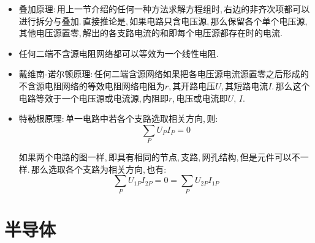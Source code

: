 

\begin{itemize}
\item 叠加原理:\,用上一节介绍的任何一种方法求解方程组时,\,右边的非齐次项都可以进行拆分与叠加.\,直接推论是,\,如果电路只含电压源,\,那么保留各个单个电压源,\,其他电压源置零,\,解出的各支路电流的和即每个电压源都存在时的电流.

\item 任何二端不含源电阻网络都可以等效为一个线性电阻.

\item 戴维南-诺尔顿原理:\,任何二端含源网络如果把各电压源电流源置零之后形成的不含源电阻网络的等效电阻网络电阻为$r$,\,其开路电压$U$,\,其短路电流$I$.\,那么这个电路等效于一个电压源或电流源,\,内阻即$r$,\,电压或电流即$U,\,I$.

\item 特勒根原理:\,单一电路中若各个支路选取相关方向,\,则:
\[\sum_P U_PI_P=0\]

如果两个电路的图一样,\,即具有相同的节点,\,支路,\,网孔结构,\,但是元件可以不一样.\,那么选取各个支路为相关方向,\,也有:
\[\sum_P U_{1P}I_{2P}=0=\sum_P U_{2P}I_{1P}\]
\end{itemize}


\section{半导体}
